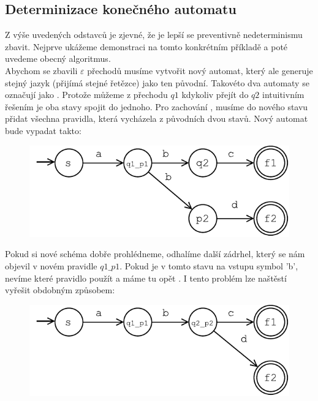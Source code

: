 \subsection{Determinizace konečného automatu}

Z výše uvedených odstavců je zjevné, že je lepší se preventivně nedeterminismu
zbavit. Nejprve ukážeme demonstraci na tomto konkrétním příkladě a poté uvedeme
obecný algoritmus.\\

Abychom se zbavili $\varepsilon$ přechodů musíme vytvořit nový automat, který ale
generuje stejný jazyk (přijímá stejné řetězce)
jako ten původní. Takovéto dva automaty se označují jako .
Protože můžeme z přechodu $q1$ kdykoliv přejít do $q2$ intuitivním řešením
je oba stavy spojit do jednoho. Pro zachování , musíme
do nového stavu přidat všechna pravidla, která vycházela z původních dvou stavů.
Nový automat bude vypadat takto:

\begin{figure}[H]
  \centering
  \includegraphics{fig/finiteAutomat1_1.pdf}
\end{figure}

Pokud si nové schéma dobře prohlédneme, odhalíme další zádrhel, který se nám
objevil v novém pravidle $q1\_p1$. Pokud je v tomto stavu na vstupu symbol 'b',
nevíme které pravidlo použít a máme tu opět .
I tento problém lze naštěstí vyřešit obdobným způsobem:

\begin{figure}[H]
  \centering
  \includegraphics{fig/finiteAutomat1_2.pdf}
\end{figure}

